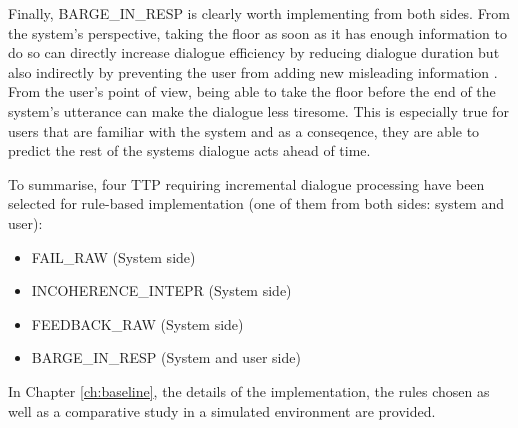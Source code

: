           Finally, BARGE\_IN\_RESP is clearly worth implementing from both sides. From the system's perspective, taking the floor as soon as it has enough information to do so can directly increase dialogue efficiency by reducing dialogue duration but also indirectly by preventing the user from adding new misleading information \cite{Ghigi2014}. From the user's point of view, being able to take the floor before the end of the system's utterance can make the dialogue less tiresome. This is especially true for users that are familiar with the system and as a conseqence, they are able to predict the rest of the systems dialogue acts ahead of time.

          To summarise, four TTP requiring incremental dialogue processing have been selected for rule-based implementation (one of them from both sides: system and user):
          \begin{itemize}
            \item FAIL\_RAW (System side)
            \item INCOHERENCE\_INTEPR (System side)
            \item FEEDBACK\_RAW (System side)
            \item BARGE\_IN\_RESP (System and user side)
          \end{itemize}

          In Chapter \ref{ch:baseline}, the details of the implementation, the rules chosen as well as a comparative study in a simulated environment are provided.
